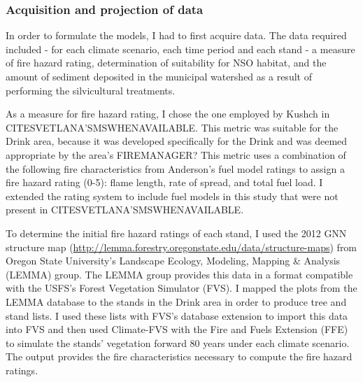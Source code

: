 \subsubsection{Acquisition and projection of data}
In order to formulate the models, I had to first acquire data. The data required included - for each climate scenario, each time period and each stand - a measure of fire hazard rating, determination of suitability for NSO habitat, and the amount of sediment deposited in the municipal watershed as a result of performing the silvicultural treatments.

As a measure for fire hazard rating, I chose the one employed by Kushch in CITESVETLANA'SMSWHENAVAILABLE. This metric was suitable for the Drink area, because it was developed specifically for the Drink and was deemed appropriate by the area's FIREMANAGER? This metric uses a combination of the following fire characteristics from Anderson's fuel model ratings \cite{anderson1982aids} to assign a fire hazard rating (0-5): flame length, rate of spread, and total fuel load. I extended the rating system to include fuel models in this study that were not present in CITESVETLANA'SMSWHENAVAILABLE.

To determine the initial fire hazard ratings of each stand, I used the 2012 GNN structure map (\url{http://lemma.forestry.oregonstate.edu/data/structure-maps}) from Oregon State University's Landscape Ecology, Modeling, Mapping \& Analysis (LEMMA) group. The LEMMA group provides this data in a format compatible with the USFS's Forest Vegetation Simulator (FVS). I mapped the plots from the LEMMA database to the stands in the Drink area in order to produce tree and stand lists. I used these lists with FVS's database extension to import this data into FVS and then used Climate-FVS with the Fire and Fuels Extension\cite{reinhardt2003fire} (FFE) to simulate the stands' vegetation forward 80 years under each climate scenario. The output provides the fire characteristics necessary to compute the fire hazard ratings.

